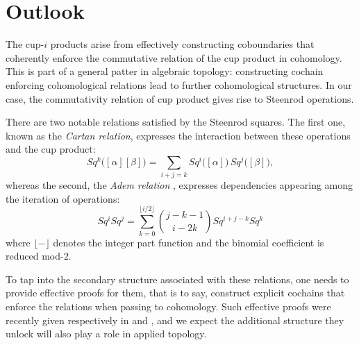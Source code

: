 
\section{Outlook}

The cup-$i$ products arise from effectively constructing coboundaries that coherently enforce the commutative relation of the cup product in cohomology.
This is part of a general patter in algebraic topology: constructing cochain enforcing cohomological relations lead to further cohomological structures.
In our case, the commutativity relation of cup product gives rise to Steenrod operations.

There are two notable relations satisfied by the Steenrod squares.
The first one, known as the \textit{Cartan relation}, expresses the interaction between these operations and the cup product:
\begin{equation*}
Sq^k \big( [\alpha] [\beta] \big) = \sum_{i+j=k} Sq^i \big([\alpha]\big)\, Sq^j \big([\beta]\big),
\end{equation*}
whereas the second, the \textit{Adem relation} \cite{adem52relations}, expresses dependencies appearing among the iteration of operations:
\begin{equation} \label{equation: adem relations}
Sq^i Sq^j = \sum_{k=0}^{\lfloor i/2 \rfloor} {j-k-1 \choose i-2k} Sq^{i+j-k} Sq^k
\end{equation}
where $\lfloor- \rfloor$ denotes the integer part function and the binomial coefficient is reduced mod-$2$.

To tap into the secondary structure associated with these relations, one needs to provide effective proofs for them, that is to say, construct explicit cochains that enforce the relations when passing to cohomology.
Such effective proofs were recently given respectively in \cite{medina2020cartan} and \cite{medina2020adem}, and we expect the additional structure they unlock will also play a role in applied topology.